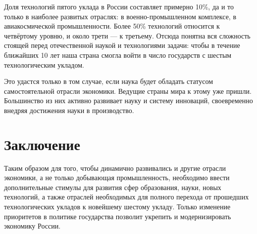 \documentclass[a4paper,12pt]{article}
\begin{document}
Доля технологий пятого уклада в России составляет примерно 10\%, да и
то только в наиболее развитых отраслях: в военно-промышленном комплексе, в
авиакосмической промышленности. Более 50\% технологий относится к четвёртому
уровню, и около трети — к третьему. Отсюда понятна вся сложность стоящей
перед отечественной наукой и технологиями задачи: чтобы в течение ближайших 10 лет 
наша страна смогла войти в число государств с шестым технологическим укладом.

Это удастся только в том случае, если наука будет обладать
статусом самостоятельной отрасли экономики. Ведущие страны мира к этому уже пришли.  
Большинство из них активно развивает науку и систему
инноваций, своевременно внедряя достижения науки в производство.
\cite{SixthTechn}

\section{Заключение}

Таким образом для того, чтобы динамично развивались и другие отрасли экономики,
а не только добывающая промышленность, необходимо ввести дополнительные
стимулы для развития сфер образования, науки, новых технологий, а также отраслей
необходимых для полного перехода от прошедших технологических укладов к новейшему шестому укладу. 
Только изменение приоритетов в политике государства позволит укрепить и
модернизировать экономику России.

{}   %
\end{document}
